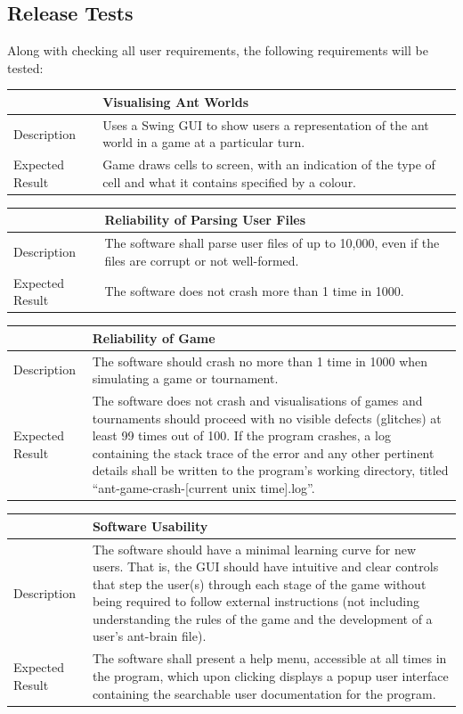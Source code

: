 \documentclass[11pt]{article}
\begin{document}
\subsection{Release Tests}\label{gui}

Along with checking all user requirements, the following requirements will be tested:

\begin{longtable}[c]{@{}p{}p{}@{}}
\toprule
& Visualising Ant Worlds \tabularnewline
\midrule
Description & Uses a Swing GUI to show users a representation of the
ant world in a game at a particular turn.\tabularnewline
Expected Result & Game draws cells to
screen, with an indication of the type of cell and what it contains
specified by a colour.\tabularnewline
\bottomrule
\end{longtable}

\begin{longtable}[c]{@{}p{}p{}@{}}
\toprule
& Reliability of Parsing User Files \tabularnewline
\midrule
Description & The software shall parse user files of up to 10,000,
even if the files are corrupt or not well-formed.\tabularnewline
Expected Result & The software does not crash more than 1 time in 1000. \tabularnewline
\bottomrule
\end{longtable}

\begin{longtable}[c]{@{}p{}p{}@{}}
\toprule
& Reliability of Game \tabularnewline
\midrule
Description & The software should crash no more than 1 time in 1000
when simulating a game or tournament.\tabularnewline
Expected Result & The software does not crash and visualisations of games
and tournaments should proceed with no visible defects (glitches) at
least 99 times out of 100. If the program crashes, a log containing the
stack trace of the error and any other pertinent details shall be
written to the program's working directory, titled
``ant-game-crash-{[}current unix time{]}.log''. \tabularnewline
\bottomrule
\end{longtable}

\begin{longtable}[c]{@{}p{}p{}@{}}
\toprule
& Software Usability \tabularnewline
\midrule
Description & The software should have a minimal learning curve for
new users. That is, the GUI should have intuitive and clear controls
that step the user(s) through each stage of the game without being
required to follow external instructions (not including understanding
the rules of the game and the development of a user's ant-brain file). \tabularnewline
Expected Result & The software shall present a help menu, accessible at
all times in the program, which upon clicking displays a popup user
interface containing the searchable user documentation for the program. \tabularnewline
\bottomrule
\end{longtable}
\end{document}
